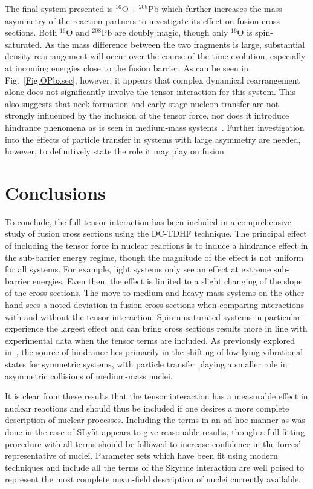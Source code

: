The final system presented is $^{16}\mathrm{O}+\mathrm{^{208}Pb}$ which further increases the mass asymmetry of the reaction partners to investigate its effect on fusion cross sections.
Both $^{16}\mathrm{O}$ and $\mathrm{^{208}Pb}$ are doubly magic, though only $^{16}\mathrm{O}$ is spin-saturated.
As the mass difference between the two fragments is large, substantial density rearrangement will occur over the course of the time evolution, especially at incoming energies close to the fusion barrier.
As can be seen in Fig.~\ref{Fig:OPbxsec}, however, it appears that complex dynamical rearrangement alone does not significantly involve the tensor interaction for this system.
This also suggests that neck formation and early stage nucleon transfer are not strongly influenced by the inclusion of the tensor force, nor does it introduce hindrance phenomena as is seen in medium-mass systems~\citep{guo2018}.
Further investigation into the effects of particle transfer in systems with large asymmetry are needed, however, to definitively state the role it may play on fusion.


\section{Conclusions}

To conclude, the full tensor interaction has been included in a comprehensive study of fusion cross sections using the DC-TDHF technique.
The principal effect of including the tensor force in nuclear reactions is to induce a hindrance effect in the sub-barrier energy regime, though the magnitude of the effect is not uniform for all systems.
For example, light systems only see an effect at extreme sub-barrier energies.
Even then, the effect is limited to a slight changing of the slope of the cross sections.
The move to medium and heavy mass systems on the other hand sees a noted deviation in fusion cross sections when comparing interactions with and without the tensor interaction.
Spin-unsaturated systems in particular experience the largest effect and can bring cross sections results more in line with experimental data when the tensor terms are included.
As previously explored in~\citep{guo2018}, the source of hindrance lies primarily in the shifting of low-lying vibrational states for symmetric systems, with particle transfer playing a smaller role in asymmetric collisions of medium-mass nuclei.

It is clear from these results that the tensor interaction has a measurable effect in nuclear reactions and should thus be included if one desires a more complete description of nuclear processes.
Including the terms in an ad hoc manner as was done in the case of SLy5t appears to give reasonable results, though a full fitting procedure with all terms should be followed to increase confidence in the forces' representative of nuclei.
Parameter sets which have been fit using modern techniques and include all the terms of the Skyrme interaction are well poised to represent the most complete mean-field description of nuclei currently available.

